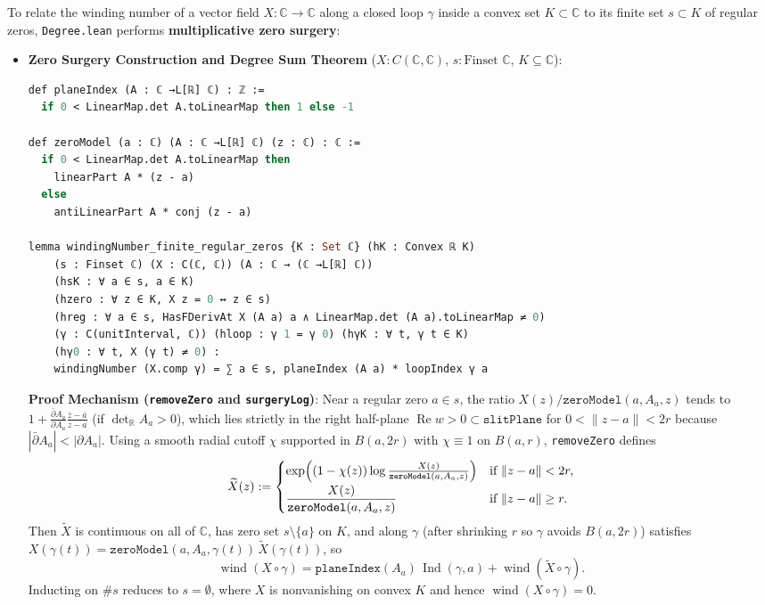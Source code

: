 \documentclass[11pt,reqno]{amsart}
\theoremstyle{definition}
\newcommand{\C}{\mathbb{C}}
\newcommand{\R}{\mathbb{R}}
\newcommand{\RePart}{\operatorname{Re}}
\newcommand{\detR}{\det_{\R}}
\newcommand{\wind}{\operatorname{wind}}
\newcommand{\ind}{\operatorname{Ind}}
\begin{document}
To relate the winding number of a vector field $X : \C \to \C$ along a closed loop $\gamma$ inside a convex set $K \subset \C$ to its finite set $s \subset K$ of regular zeros, \texttt{Degree.lean} performs \textbf{multiplicative zero surgery}:

\begin{itemize}
\item \textbf{Zero Surgery Construction and Degree Sum Theorem} ($X : C(\C,\C)$, $s : \text{Finset }\C$, $K \subseteq \C$):
\begin{lstlisting}[language=Caml]
def planeIndex (A : ℂ →L[ℝ] ℂ) : ℤ :=
  if 0 < LinearMap.det A.toLinearMap then 1 else -1

def zeroModel (a : ℂ) (A : ℂ →L[ℝ] ℂ) (z : ℂ) : ℂ :=
  if 0 < LinearMap.det A.toLinearMap then
    linearPart A * (z - a)
  else
    antiLinearPart A * conj (z - a)

lemma windingNumber_finite_regular_zeros {K : Set ℂ} (hK : Convex ℝ K)
    (s : Finset ℂ) (X : C(ℂ, ℂ)) (A : ℂ → (ℂ →L[ℝ] ℂ))
    (hsK : ∀ a ∈ s, a ∈ K)
    (hzero : ∀ z ∈ K, X z = 0 ↔ z ∈ s)
    (hreg : ∀ a ∈ s, HasFDerivAt X (A a) a ∧ LinearMap.det (A a).toLinearMap ≠ 0)
    (γ : C(unitInterval, ℂ)) (hloop : γ 1 = γ 0) (hγK : ∀ t, γ t ∈ K)
    (hγ0 : ∀ t, X (γ t) ≠ 0) :
    windingNumber (X.comp γ) = ∑ a ∈ s, planeIndex (A a) * loopIndex γ a
\end{lstlisting}
\textbf{Proof Mechanism (\texttt{removeZero} and \texttt{surgeryLog})}: Near a regular zero $a \in s$, the ratio $X(z)/\texttt{zeroModel}(a, A_a, z)$ tends to $1 + \frac{\bar{\partial}A_a}{\partial A_a}\frac{\bar{z}-\bar{a}}{z-a}$ (if $\detR A_a > 0$), which lies strictly in the right half-plane $\RePart w > 0 \subset \texttt{slitPlane}$ for $0 < \|z-a\| < 2r$ because $|\bar{\partial}A_a| < |\partial A_a|$. Using a smooth radial cutoff $\chi$ supported in $B(a, 2r)$ with $\chi \equiv 1$ on $B(a,r)$, \texttt{removeZero} defines
\[
\widetilde{X}(z) := \begin{cases}
\exp\Bigl((1-\chi(z))\log\frac{X(z)}{\texttt{zeroModel}(a,A_a,z)}\Bigr) & \text{if } \|z-a\| < 2r,\\[4pt]
\dfrac{X(z)}{\texttt{zeroModel}(a,A_a,z)} & \text{if } \|z-a\| \ge r.
\end{cases}
\]
Then $\widetilde{X}$ is continuous on all of $\C$, has zero set $s \setminus \{a\}$ on $K$, and along $\gamma$ (after shrinking $r$ so $\gamma$ avoids $B(a,2r)$) satisfies $X(\gamma(t)) = \texttt{zeroModel}(a,A_a,\gamma(t))\,\widetilde{X}(\gamma(t))$, so
\[
\wind(X \circ \gamma) = \texttt{planeIndex}(A_a)\,\ind(\gamma, a) + \wind(\widetilde{X} \circ \gamma).
\]
Inducting on $\# s$ reduces to $s = \emptyset$, where $X$ is nonvanishing on convex $K$ and hence $\wind(X \circ \gamma) = 0$.
\end{itemize}
\end{document}
